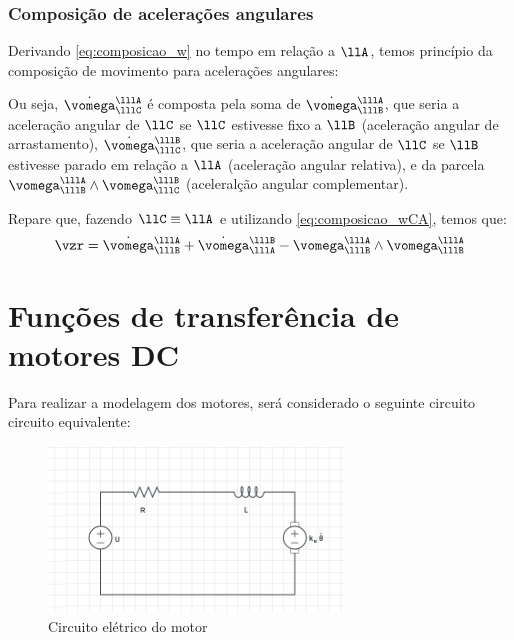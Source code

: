 \documentclass[]{politex}
\newcommand*\mybluebox[1]{%
\colorbox{myblue}{\hspace{1em}#1\hspace{1em}}}
\newcommand*\almondbox[1]{%
\colorbox{almond}{\hspace{1em}#1\hspace{1em}}}
\begin{document}
\subsection{Composição de acelerações angulares}

Derivando \eqref{eq:composicao_w} no tempo em relação a $\llA$, temos princípio da composição de movimento para acelerações angulares:

Ou seja, $\dot{\vomega}_{\lllC}^{\lllA}$ é composta pela soma de $\dot{\vomega}_{\lllB}^{\lllA}$, que seria a aceleração angular  de $\llC$ se $\llC$ estivesse fixo a $\llB$ (aceleração angular de arrastamento), $\dot{\vomega}_{\lllC}^{\lllB}$, que seria a aceleração angular de $\llC$ se $\llB$ estivesse parado em relação a $\llA$ (aceleração angular relativa), e da parcela $\vomega_{\lllB}^{\lllA} \wedge \vomega_{\lllC}^{\lllB}$ (aceleralção angular complementar).

Repare que, fazendo $\llC \equiv \llA$ e utilizando \eqref{eq:composicao_wCA}, temos que:
\begin{equation}
\vzr =  \dot{\vomega}_{\lllB}^{\lllA}   + \dot{\vomega}_{\lllA}^{\lllB} - \vomega_{\lllB}^{\lllA} \wedge \vomega_{\lllB}^{\lllA}
\end{equation}

\chapter{Funções de transferência de motores DC} \label{chap:FuncoesDeTransferencia}

Para realizar a modelagem dos motores, será considerado o seguinte circuito circuito equivalente:


\begin{figure}[!h]
     \centering
     \includegraphics[width=0.7\textwidth]{imagens/CircuitoMotor.png}
     \caption{Circuito elétrico do motor}
     \label{CEM1}
\end{figure}
\end{document}
